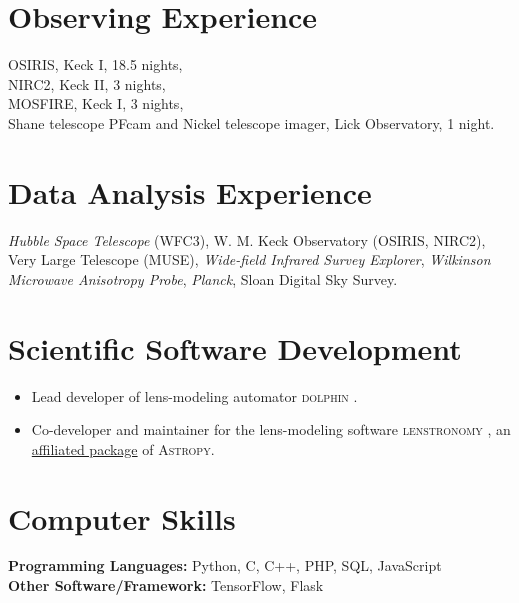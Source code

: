 \documentclass[margin, line]{res}
\newenvironment{list2}{
  \begin{list}{$\bullet$}{%
      \setlength{\itemsep}{0in}
      \setlength{\parsep}{0in} \setlength{\parskip}{0in}
      \setlength{\topsep}{0in} \setlength{\partopsep}{0in} 
      \setlength{\leftmargin}{0.2in}}}{\end{list}}
\begin{document}
\begin{resume}
\section{\sc Observing Experience}
OSIRIS, Keck I, 18.5 nights,\\
NIRC2, Keck II, 3 nights, \\
MOSFIRE, Keck I, 3 nights, \\
Shane telescope PFcam and Nickel telescope imager, Lick Observatory, 1 night.


\section{\sc Data Analysis Experience}
\textit{Hubble Space Telescope} (WFC3), 
W. M. Keck Observatory (OSIRIS, NIRC2),
Very Large Telescope (MUSE),
{\it Wide-field Infrared Survey Explorer},
{\it Wilkinson Microwave Anisotropy Probe},
{\it Planck},
Sloan Digital Sky Survey.

\section{\sc Scientific Software Development} 
\begin{itemize}
	\item Lead developer of lens-modeling automator \textsc{dolphin} \href{https://github.com/ajshajib/dolphin}{\faGithub}.
	\item Co-developer and maintainer for the lens-modeling software \textsc{lenstronomy} \href{https://github.com/lenstronomy/lenstronomy}{\faGithub}, an \href{https://www.astropy.org/affiliated/index.html}{affiliated package} of \textsc{Astropy}.
\end{itemize}

\section{\sc Computer Skills} 
\textbf{Programming Languages:} Python, C, C++, PHP, SQL, JavaScript \\
\textbf{Other Software/Framework:} TensorFlow, Flask



\end{resume}
\end{document}
